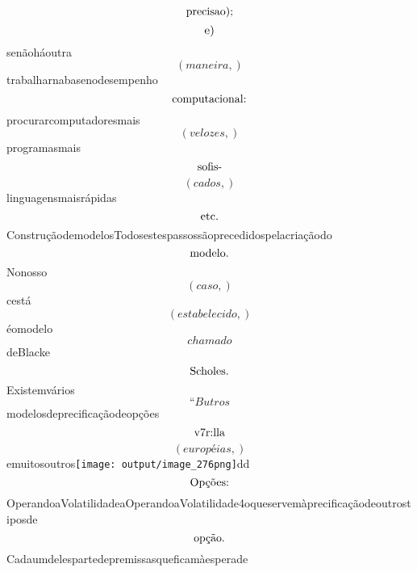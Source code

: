 \documentclass{article}
\begin{document}
\begin{equation}
$precisao);$
\end{equation}\begin{equation}
$e)$
\end{equation}senãoháoutra\begin{equation}
\left( maneira,\right)
\end{equation}trabalharnabasenodesempenho\begin{equation}
$computacional:$
\end{equation}procurarcomputadoresmais\begin{equation}
\left( velozes,\right)
\end{equation}programasmais\begin{equation}
$sofis-$
\end{equation}\begin{equation}
\left( cados,\right)
\end{equation}linguagensmaisrápidas\begin{equation}
$etc.$
\end{equation}ConstruçãodemodelosTodosestespassossãoprecedidospelacriaçãodo\begin{equation}
$modelo.$
\end{equation}Nonosso\begin{equation}
\left( caso,\right)
\end{equation}cestá\begin{equation}
\left( estabelecido,\right)
\end{equation}éomodelo\begin{equation}
chamado
\end{equation}deBlacke\begin{equation}
$Scholes.$
\end{equation}Existemvários\begin{equation}
“Butros
\end{equation}modelosdeprecificaçãodeopções\begin{equation}
$v7r:lla$
\end{equation}\begin{equation}
\left( européias,\right)
\end{equation}emuitosoutros\texttt{[image: output/image\_276png]}dd\begin{equation}
$Opções:$
\end{equation}OperandoaVolatilidadeaOperandoaVolatilidade4oqueservemàprecificaçãodeoutrostiposde\begin{equation}
$opção.$
\end{equation}Cadaumdelespartedepremissasqueficamàesperade\begin{equation}

\end{equation}
\end{document}
